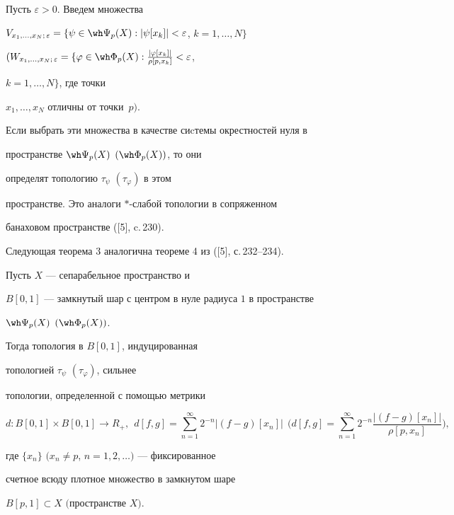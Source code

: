 Пусть $\varepsilon > 0$. Введем множества


$V_{x_{1},\dotsc,x_{N};\, \varepsilon} = \{\psi \in \wh


\Psi_{p}(X) : |\psi [x_{k}]| < \varepsilon$, $k = 1,\dotsc,N \}$


$(W_{x_{1},\dotsc,x_{N};\, \varepsilon} =


\{\varphi \in \wh \Phi_{p}(X) :


\frac{|\varphi[x_{k}]|}{\rho[p,x_{k}]} < \varepsilon$,


$k = 1,\dotsc,N \}$, где точки


$x_{1},\dotsc,x_{N}$ отличны от точки~$p)$.


Если выбрать эти множества в качестве сиcтемы окрестностей нуля в


пространстве $\wh \Psi_{p}(X)$ $(\wh \Phi_{p}(X))$, то они


определят топологию $\tau_{\psi}$ $(\tau_{\varphi})$ в этом


пространстве. Это аналоги $\ast$-слабой топологии в сопряженном


банаховом пространстве ([5], c.\,230).





Следующая теорема 3 аналогична теореме 4 из ([5], с.\,232--234).





\begin{thm}


Пусть $X$ --- сепарабельное пространство и


$B[0,1]$ --- замкнутый шар с центром в нуле радиуса $1$ в пространстве


$\wh \Psi_{p}(X)$ $(\wh \Phi_{p}(X))$. 


Тогда топология в $B[0,1]$, индуцированная


топологией $\tau_{\psi}$ $(\tau_{\varphi})$, сильнее


топологии, определенной с помощью метрики


$$


d : B[0,1] \times B[0,1] \rightarrow R_{+},\ \


d[f,g] = \sum\limits_{n=1}^{\infty} 2^{- n}|(f - g)[x_{n}]|\ \


\bigg(d[f,g] = \sum\limits_{n=1}^{\infty} 2^{- n}


\frac{|(f - g)[x_{n}]|}{\rho[p,x_{n}]}\bigg),


$$


где $\{x_{n}\}$ $(x_{n} \neq p$, $n=1,2,\dotsc)$ --- фиксированное


счетное всюду плотное множество в замкнутом шаре


$B[p,1] \subset X$ $($пространстве $X)$.


\end{thm}





